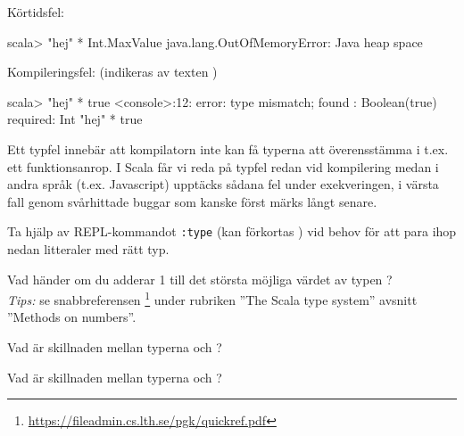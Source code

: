 \SubtaskSolved Körtidsfel:
\begin{REPLnonum}
scala> "hej" * Int.MaxValue
java.lang.OutOfMemoryError: Java heap space
\end{REPLnonum}

\SubtaskSolved Kompileringsfel: (indikeras av texten )
\begin{REPLnonum}
scala> "hej" * true
<console>:12: error: type mismatch;
 found   : Boolean(true)
 required: Int
       "hej" * true
\end{REPLnonum}
Ett typfel innebär att kompilatorn inte kan få typerna att överensstämma i t.ex. ett funktionsanrop. I Scala får vi reda på typfel redan vid kompilering medan i andra språk (t.ex. Javascript) upptäcks sådana fel under exekveringen, i värsta fall genom svårhittade buggar som kanske först märks långt senare.

\QUESTEND





\QUESTBEGIN

\Task \what

\Subtask Ta hjälp av REPL-kommandot \verb+:type+ (kan förkortas ) vid behov för att para ihop nedan litteraler med rätt typ.

\begin{ConceptConnections}[0.35\textwidth]

\end{ConceptConnections}

\Subtask Vad händer om du adderar 1 till det största möjliga värdet av typen ?
\\\emph{Tips:} se snabbreferensen \footnote{\url{https://fileadmin.cs.lth.se/pgk/quickref.pdf}} under rubriken ''The Scala type system'' avsnitt ''Methods on numbers''.

\Subtask Vad är skillnaden mellan typerna  och ?

\Subtask Vad är skillnaden mellan typerna  och ?


